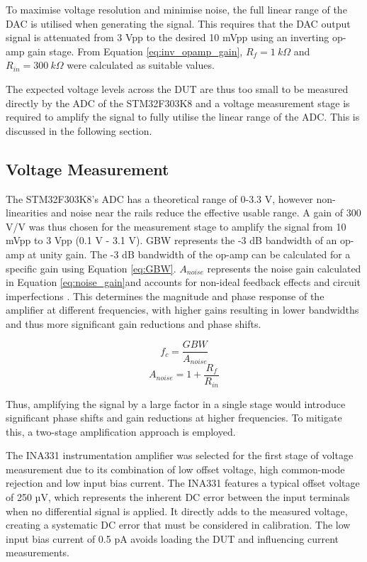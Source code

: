 To maximise voltage resolution and minimise noise, the full linear range of the \ac{DAC} is utilised when generating the signal. This requires that the \ac{DAC} output signal is attenuated from 3 Vpp to the desired 10 mVpp using an inverting op-amp gain stage. From Equation \ref{eq:inv_opamp_gain}, $R_{f}=1~k\Omega$ and $R_{in}=300~k\Omega$ were calculated as suitable values.

The expected voltage levels across the \ac{DUT} are thus too small to be measured directly by the \ac{ADC} of the STM32F303K8 and a voltage measurement stage is required to amplify the signal to fully utilise the linear range of the \ac{ADC}. This is discussed in the following section.

\subsection{Voltage Measurement}
The STM32F303K8's \ac{ADC} has a theoretical range of 0-3.3 V, however non-linearities and noise near the rails reduce the effective usable range. A gain of 300 V/V was thus chosen for the measurement stage to amplify the signal from 10 mVpp to 3 Vpp (0.1 V - 3.1 V). \Ac{GBW} represents the -3 dB bandwidth of an op-amp at unity gain. The -3 dB bandwidth of the op-amp can be calculated for a specific gain using Equation \ref{eq:GBW}. $A_{noise}$ represents the noise gain calculated in Equation \ref{eq:noise_gain}and accounts for non-ideal feedback effects and circuit imperfections \cite{fiore53GainBandwidthProduct2018}. This determines the magnitude and phase response of the amplifier at different frequencies, with higher gains resulting in lower bandwidths and thus more significant gain reductions and phase shifts.

\begin{equation}
    f_c = \frac{GBW}{A_{noise}}
    \label{eq:GBW}
\end{equation}
\begin{equation}
    A_{noise} = 1 + \frac{R_f}{R_{in}}
    \label{eq:noise_gain}
\end{equation}

Thus, amplifying the signal by a large factor in a single stage would introduce significant phase shifts and gain reductions at higher frequencies. To mitigate this, a two-stage amplification approach is employed.

The INA331 instrumentation amplifier was selected for the first stage of voltage measurement due to its combination of low offset voltage, high common-mode rejection and low input bias current. The INA331 features a typical offset voltage of 250 µV, which represents the inherent DC error between the input terminals when no differential signal is applied. It directly adds to the measured voltage, creating a systematic DC error that must be considered in calibration. The low input bias current of 0.5 pA avoids loading the \ac{DUT} and influencing current measurements. 

